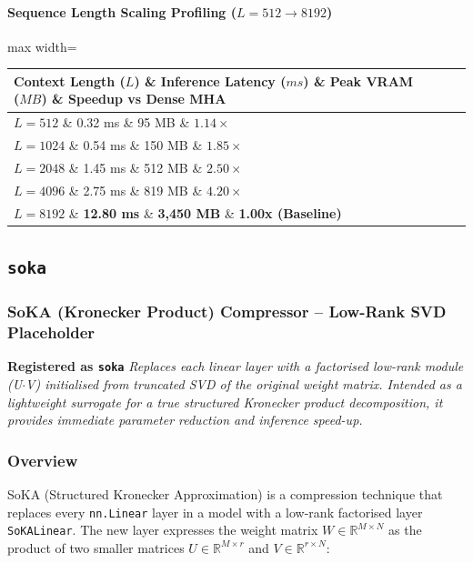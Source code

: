 \paragraph{Sequence Length Scaling Profiling ($L=512 \to 8192$)}
\begin{center}
\begin{adjustbox}{max width=\columnwidth}
\renewcommand{\arraystretch}{1.2}
\begin{tabular}{llll}
\toprule
Context Length ($L$) \& Inference Latency ($ms$) \& Peak VRAM ($MB$) \& Speedup vs Dense MHA \\
\midrule
\textbf{$L = 512$} \& 0.32 ms \& 95 MB \& $1.14\times$ \\
\textbf{$L = 1024$} \& 0.54 ms \& 150 MB \& $1.85\times$ \\
\textbf{$L = 2048$} \& 1.45 ms \& 512 MB \& $2.50\times$ \\
\textbf{$L = 4096$} \& 2.75 ms \& 819 MB \& $4.20\times$ \\
\textbf{$L = 8192$} \& \textbf{12.80 ms} \& \textbf{3,450 MB} \& \textbf{1.00x (Baseline)} \\


\bottomrule
\end{tabular}
\end{adjustbox}
\end{center}

\subsection{\texttt{soka}}
\subsubsection*{SoKA (Kronecker Product) Compressor -- Low-Rank SVD Placeholder}

\textbf{Registered as \texttt{soka}}
\textit{Replaces each linear layer with a factorised low-rank module (U$\cdot$V) initialised from truncated SVD of the original weight matrix. Intended as a lightweight surrogate for a true structured Kronecker product decomposition, it provides immediate parameter reduction and inference speed-up.}


\subsubsection*{Overview}

SoKA (Structured Kronecker Approximation) is a compression technique that replaces every \texttt{nn.Linear} layer in a model with a low-rank factorised layer \texttt{SoKALinear}. The new layer expresses the weight matrix $W \in \mathbb{R}^{M \times N}$ as the product of two smaller matrices $U \in \mathbb{R}^{M \times r}$ and $V \in \mathbb{R}^{r \times N}$:

